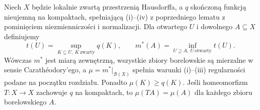 \begin{lemat}
\label{lem:haar-content-to-measure-23}
Niech $X$ będzie lokalnie zwartą przestrzenią Hausdorffa,
a $q$ skończoną funkcją nieujemną na kompaktach,
spełniającą (i)--(iv) z poprzedniego lematu z pominięciem
niezmienniczości i normalizacji. Dla otwartego $U$
i dowolnego $A\subseteq X$ definiujemy
\begin{equation}\label{eq:haar-from-content-23}
 t(U)=\sup_{K\subseteq U,\ K\ \mathrm{zwarty}}q(K),
 \qquad
 m^*(A)=\inf_{U\supseteq A,\ U\ \mathrm{otwarty}}t(U).
\end{equation}
Wówczas $m^*$ jest miarą zewnętrzną,
wszystkie zbiory borelowskie są mierzalne w sensie
Carathéodory'ego, a $\mu=m^*|_{\mathcal B(X)}$
spełnia warunki (i)--(iii) regularności podane
na początku rozdziału. Ponadto $\mu(K)\ge q(K)$.
Jeśli homeomorfizm $T:X\to X$ zachowuje $q$ na
kompaktach, to $\mu(TA)=\mu(A)$ dla każdego
zbioru borelowskiego $A$.
\end{lemat}
